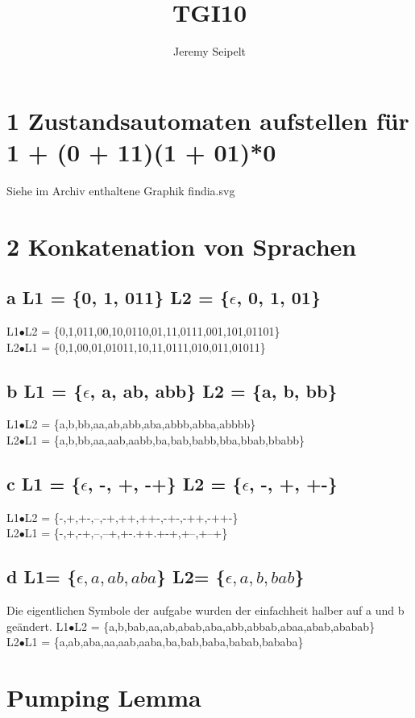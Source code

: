\documentclass[11pt]{article} %
\title{TGI10}
\author{Jeremy Seipelt}
\begin{document}
\maketitle

\section{1 Zustandsautomaten aufstellen für 1 + (0 + 11)(1 + 01)*0}
Siehe im Archiv enthaltene Graphik findia.svg
\section{2 Konkatenation von Sprachen}
\subsection{a  L1 = \{0, 1, 011\} L2 = \{$\epsilon$, 0, 1, 01\}}
L1$\bullet$L2 = \{0,1,011,00,10,0110,01,11,0111,001,101,01101\}\\
L2$\bullet$L1 = \{0,1,00,01,01011,10,11,0111,010,011,01011\}\\
\subsection{b L1 = \{$\epsilon$, a, ab, abb\} L2 = \{a, b, bb\}}
L1$\bullet$L2 = \{a,b,bb,aa,ab,abb,aba,abbb,abba,abbbb\}\\
L2$\bullet$L1 = \{a,b,bb,aa,aab,aabb,ba,bab,babb,bba,bbab,bbabb\}\\
\subsection{c L1 = \{$\epsilon$, -, +, -+\} L2 = \{$\epsilon$, -, +, +-\}}
L1$\bullet$L2 = \{-,+,+-,--,-+,++,++-,-+-,-++,-++-\}\\
L2$\bullet$L1 = \{-,+,-+,--,--+,+-.++.+-+,+--,+--+\}\\
\subsection{d L1= \{$\epsilon, a, ab,aba$\}  L2= \{$\epsilon,a,b,bab$\}}
Die eigentlichen Symbole der aufgabe wurden der einfachheit halber auf a und b geändert.
L1$\bullet$L2 = \{a,b,bab,aa,ab,abab,aba,abb,abbab,abaa,abab,ababab\}\\
L2$\bullet$L1 = \{a,ab,aba,aa,aab,aaba,ba,bab,baba,babab,bababa\}\\
 \section{Pumping Lemma}
\end{document}
